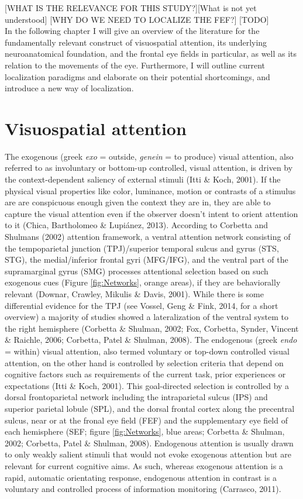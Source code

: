 \documentclass[a4paper, 11pt]{scrreprt}
\begin{document}
[WHAT IS THE RELEVANCE FOR THIS STUDY?][What is not yet understood]
[WHY DO WE NEED TO LOCALIZE THE FEF?]
[TODO]  \\

In the following chapter I will give an overview of the literature for the fundamentally relevant construct of visuospatial attention, its underlying neuroanatomical foundation, and the frontal eye fields in particular, as well as its relation to the movements of the eye. Furthermore, I will outline current localization paradigms and elaborate on their potential shortcomings, and introduce a new way of localization.

\section{Visuospatial attention}
The exogenous (greek \textit{exo} = outside, \textit{genein} = to produce) visual attention, also referred to as involuntary or bottom-up controlled, visual attention, is driven by the context-dependent saliency of external stimuli (Itti \& Koch, 2001). If the physical visual properties like color, luminance, motion or contrasts of a stimulus are are conspicuous enough given the context they are in, they are able to capture the visual attention even if the observer doesn’t intent to orient attention to it (Chica, Bartholomeo \& Lupiánez, 2013). According to Corbetta and Shulmans (2002) attention framework, a ventral attention network consisting of the tempoparietal junction (TPJ)/superior temporal sulcus and gyrus (STS, STG), the medial/inferior frontal gyri (MFG/IFG), and the ventral part of the supramarginal gyrus (SMG) processes attentional selection based on such exogenous cues (Figure \ref{fig:Networks}, orange areas), if they are behaviorally relevant (Downar, Crawley, Mikulis \& Davis, 2001). While there is some differential evidence for the TPJ (see Vossel, Geng \& Fink, 2014, for a short overview) a majority of studies showed a lateralization of the ventral system to the right hemisphere (Corbetta \& Shulman, 2002; Fox, Corbetta, Synder, Vincent \& Raichle, 2006; Corbetta, Patel \& Shulman, 2008). \newline 
The endogenous (greek \textit{endo} = within) visual attention, also termed voluntary or top-down controlled visual attention, on the other hand is controlled by selection criteria that depend on cognitive factors such as requirements of the current task, prior experiences or expectations (Itti \& Koch, 2001). This goal-directed selection is controlled by a dorsal frontoparietal network including the intraparietal sulcus (IPS) and superior parietal lobule (SPL), and the dorsal frontal cortex along the precentral sulcus, near or at the fronal eye field (FEF) and the supplementary eye field of each hemisphere (SEF; figure \ref{fig:Networks}, blue areas; Corbetta \& Shulman, 2002; Corbetta, Patel \& Shulman, 2008). Endogenous attention is usually drawn to only weakly salient stimuli that would not evoke exogenous attention but are relevant for current cognitive aims. As such, whereas exogenous attention is a rapid, automatic orientating response, endogenous attention in contrast is a voluntary and controlled process of information monitoring (Carrasco, 2011).
\end{document}
